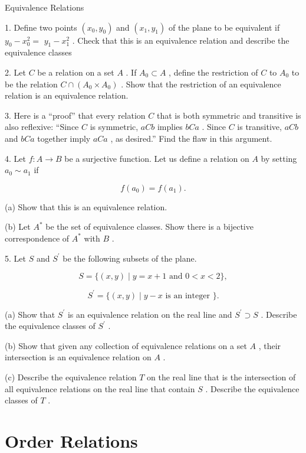 Equivalence Relations

1. Define two points \(\left( {{x}_{0},{y}_{0}}\right)\) and \(\left( {{x}_{1},{y}_{1}}\right)\) of the plane to be equivalent if \({y}_{0} - {x}_{0}^{2} =\)  \({y}_{1} - {x}_{1}^{2}\) . Check that this is an equivalence relation and describe the equivalence classes

2. Let \(C\) be a relation on a set \(A\) . If \({A}_{0} \subset  A\) , define the restriction of \(C\) to \({A}_{0}\) to be the relation \(C \cap  \left( {{A}_{0} \times  {A}_{0}}\right)\) . Show that the restriction of an equivalence relation is an equivalence relation.

3. Here is a ``proof'' that every relation \(C\) that is both symmetric and transitive is also reflexive: ``Since \(C\) is symmetric, \({aCb}\) implies \({bCa}\) . Since \(C\) is transitive, \({aCb}\) and \({bCa}\) together imply \({aCa}\) , as desired.'' Find the flaw in this argument.

4. Let \(f : A \rightarrow  B\) be a surjective function. Let us define a relation on \(A\) by setting \({a}_{0} \sim  {a}_{1}\) if

\[
f\left( {a}_{0}\right)  = f\left( {a}_{1}\right) .
\]

(a) Show that this is an equivalence relation.

(b) Let \({A}^{ * }\) be the set of equivalence classes. Show there is a bijective correspondence of \({A}^{ * }\) with \(B\) .

5. Let \(S\) and \({S}^{\prime }\) be the following subsets of the plane.

\[
S = \{ \left( {x,y}\right)  \mid  y = x + 1\text{ and }0 < x < 2\} ,
\]

\[
{S}^{\prime } = \{ \left( {x,y}\right)  \mid  y - x\text{ is an integer }\} .
\]

(a) Show that \({S}^{\prime }\) is an equivalence relation on the real line and \({S}^{\prime } \supset  S\) . Describe the equivalence classes of \({S}^{\prime }\) .

(b) Show that given any collection of equivalence relations on a set \(A\) , their intersection is an equivalence relation on \(A\) .

(c) Describe the equivalence relation \(T\) on the real line that is the intersection of all equivalence relations on the real line that contain \(S\) . Describe the equivalence classes of \(T\) .

\section*{Order Relations}

